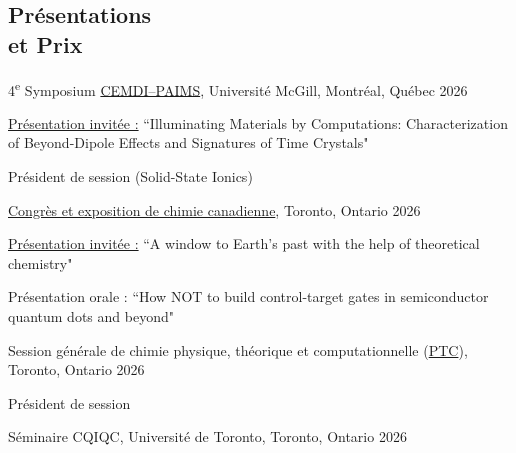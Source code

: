 \documentclass[margin,line]{res}
\newenvironment{list1}{
 \begin{list}{\ding{113}}{%
  \setlength{\itemsep}{0in}
  \setlength{\parsep}{0in} \setlength{\parskip}{0in}
  \setlength{\topsep}{0in} \setlength{\partopsep}{0in} 
  \setlength{\leftmargin}{0.17in}}}{\end{list}}
\begin{document}
\newpage

\pagestyle{headings}


\begin{resume}

\section{\sc Présentations \\et Prix}

4\textsuperscript{e} Symposium \href{https://cemdi.ca/symposium.php?id=evt_4th_symposium_2026}{CEMDI--PAIMS}, Université McGill, Montréal, Québec \hfill{2026}

\begin{list1}
\item[]\underline{Présentation invitée :} ``Illuminating Materials by Computations: Characterization of Beyond-Dipole Effects and Signatures of Time Crystals"
\item[]Président de session (Solid-State Ionics)
\end{list1}

\vspace*{-1mm}

\href{https://www.cheminst.ca/conference/x2026/}{Congrès et exposition de chimie canadienne}, Toronto, Ontario \hfill{2026}

\begin{list1}
\item[]\underline{Présentation invitée :} ``A window to Earth's past with the help of theoretical chemistry"
\item[]Présentation orale : ``How NOT to build control-target gates in semiconductor quantum dots and beyond"
\end{list1}

\vspace*{-1mm}

Session générale de chimie physique, théorique et computationnelle (\href{https://www.cheminst.ca/physical-theoretical-and-computational-division-ptc/}{PTC}), Toronto, Ontario \hfill{2026}

\begin{list1}
\item[]Président de session
\end{list1}

\vspace*{-1mm}

Séminaire CQIQC, Université de Toronto, Toronto, Ontario \hfill{2026}


\end{resume}
\end{document}
